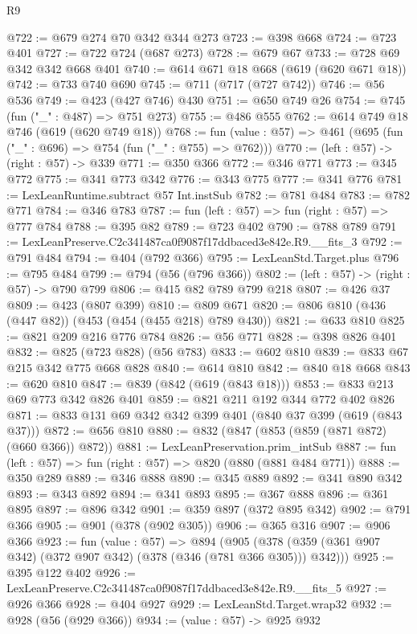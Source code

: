 \begin{lexlean}{R9}
\begin{coremodule}
@722 := @679 @274 @70 @342 @344 @273
@723 := @398 @668
@724 := @723 @401
@727 := @722 @724 (@687 @273)
@728 := @679 @67
@733 := @728 @69 @342 @342 @668 @401
@740 := @614 @671 @18 @668 (@619 (@620 @671 @18))
@742 := @733 @740 @690
@745 := @711 (@717 (@727 @742))
@746 := @56 @536
@749 := @423 (@427 @746) @430
@751 := @650 @749 @26
@754 := @745 (fun ("_" : @487) => @751 @273)
@755 := @486 @555
@762 := @614 @749 @18 @746 (@619 (@620 @749 @18))
@768 := fun (value : @57) => @461 (@695 (fun ("_" : @696) => @754 (fun ("_" : @755) => @762)))
@770 := (left : @57) -> (right : @57) -> @339
@771 := @350 @366
@772 := @346 @771
@773 := @345 @772
@775 := @341 @773 @342
@776 := @343 @775
@777 := @341 @776
@781 := LexLeanRuntime.subtract @57 Int.instSub
@782 := @781 @484
@783 := @782 @771
@784 := @346 @783
@787 := fun (left : @57) => fun (right : @57) => @777 @784
@788 := @395 @82
@789 := @723 @402
@790 := @788 @789
@791 := LexLeanPreserve.C2c341487ca0f9087f17ddbaced3e842e.R9.__fits_3
@792 := @791 @484
@794 := @404 (@792 @366)
@795 := LexLeanStd.Target.plus
@796 := @795 @484
@799 := @794 (@56 (@796 @366))
@802 := (left : @57) -> (right : @57) -> @790 @799
@806 := @415 @82 @789 @799 @218
@807 := @426 @37
@809 := @423 (@807 @399)
@810 := @809 @671
@820 := @806 @810 (@436 (@447 @82)) (@453 (@454 (@455 @218) @789 @430))
@821 := @633 @810
@825 := @821 @209 @216 @776 @784
@826 := @56 @771
@828 := @398 @826 @401
@832 := @825 (@723 @828) (@56 @783)
@833 := @602 @810
@839 := @833 @67 @215 @342 @775 @668 @828
@840 := @614 @810
@842 := @840 @18 @668
@843 := @620 @810
@847 := @839 (@842 (@619 (@843 @18)))
@853 := @833 @213 @69 @773 @342 @826 @401
@859 := @821 @211 @192 @344 @772 @402 @826
@871 := @833 @131 @69 @342 @342 @399 @401 (@840 @37 @399 (@619 (@843 @37)))
@872 := @656 @810
@880 := @832 (@847 (@853 (@859 (@871 @872) (@660 @366)) @872))
@881 := LexLeanPreservation.prim_intSub
@887 := fun (left : @57) => fun (right : @57) => @820 (@880 (@881 @484 @771))
@888 := @350 @289
@889 := @346 @888
@890 := @345 @889
@892 := @341 @890 @342
@893 := @343 @892
@894 := @341 @893
@895 := @367 @888
@896 := @361 @895
@897 := @896 @342
@901 := @359 @897 (@372 @895 @342)
@902 := @791 @366
@905 := @901 (@378 (@902 @305))
@906 := @365 @316
@907 := @906 @366
@923 := fun (value : @57) =>
  @894 (@905 (@378 (@359 (@361 @907 @342) (@372 @907 @342) (@378 (@346 (@781 @366 @305))) @342)))
@925 := @395 @122 @402
@926 := LexLeanPreserve.C2c341487ca0f9087f17ddbaced3e842e.R9.__fits_5
@927 := @926 @366
@928 := @404 @927
@929 := LexLeanStd.Target.wrap32
@932 := @928 (@56 (@929 @366))
@934 := (value : @57) -> @925 @932

\end{coremodule}
\end{lexlean}
